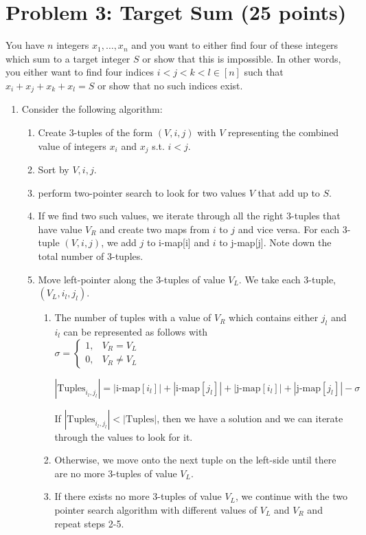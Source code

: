 \documentclass[12pt]{article}
\begin{document}
\section*{Problem 3: Target Sum (25 points)}
You have $n$ integers $x_1,\ldots,x_n$ and you want to either find four of these integers which sum to a target integer $S$ or show that this is impossible. In other words, you either want to find four indices $i < j < k < l \in [n]$ such that $x_i + x_j + x_k + x_l = S$ or show that no such indices exist.
\begin{enumerate}
\item[(a)] Consider the following algorithm:
\begin{enumerate}
  \item[1)] Create 3-tuples of the form $(V, i, j)$ with $V$ representing the combined value of integers $x_i$ and $x_j$ s.t. $i < j$. 
  \item[2)] Sort by $V, i, j$.
  \item[3)] perform two-pointer search to look for two values $V$ that add up to $S$.
  \item[4)] If we find two such values, we iterate through all the right 3-tuples that have value $V_R$ and create two maps from $i$ to $j$ and vice versa. For each 3-tuple $(V, i, j)$, we add $j$ to i-map[i] and $i$ to j-map[j]. Note down the total number of 3-tuples. 
  \item[5)] Move left-pointer along the 3-tuples of value $V_L$. We take each 3-tuple, $(V_L, i_l, j_l)$. 
  \begin{enumerate}
  \item The number of tuples with a value of $V_R$ which contains either $j_l$ and $i_l$ can be represented as follows with \\
  
  $\sigma=
    \begin{cases}
      1, & V_R = V_L\\
      0, & V_R \neq V_L
    \end{cases}$
  
    \begin{equation}
      |\text{Tuples}_{i_l, j_l}| = |\text{i-map}[i_l]| + |\text{i-map}[j_l]| + |\text{j-map}[i_l]| + |\text{j-map}[j_l]| - \sigma
    \end{equation}
    
    If $|\text{Tuples}_{i_l, j_l}| < |\text{Tuples}|$, then we have a solution and we can iterate through the values to look for it. 
  \item Otherwise, we move onto the next tuple on the left-side until there are no more 3-tuples of value $V_L$.
  \item If there exists no more 3-tuples of value $V_L$, we continue with the two pointer search algorithm with different values of $V_L$ and $V_R$ and repeat steps 2-5. \\
  

\end{enumerate}
\end{enumerate}
\end{enumerate}
\end{document}
